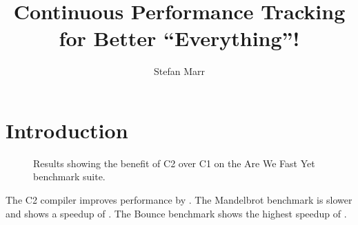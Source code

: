 \documentclass[acmsmall,screen,review]{acmart}
\begin{document}
\title{Continuous Performance Tracking for Better ``Everything''!}

\author{Stefan Marr}


\maketitle

\section{Introduction}

\begin{figure}[h]
  \centering
  \Overview{}
  \caption{
    Results showing the benefit of C2 over C1
    on the Are We Fast Yet benchmark suite.}
\end{figure}

The C2 compiler improves performance by \SpeedupGMeanX.
The Mandelbrot benchmark is slower and shows a speedup of \SpeedupMinX.
The Bounce benchmark shows the highest speedup of \SpeedupMaxX.



\end{document}
